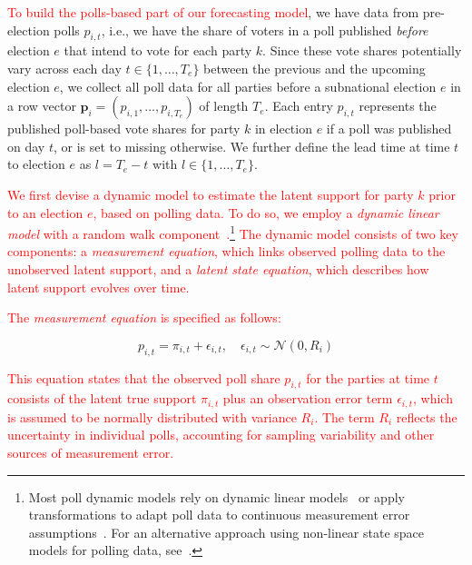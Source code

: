 \documentclass[doublespaced,12pt]{article}
\begin{document}
\begin{doublespacing}
 \textcolor{red}{To build the polls-based part of our forecasting model}, we have data from pre-election polls \( p_{i,t} \), i.e., we have the share of voters in a poll published \textit{before} election $e$ that intend to vote for each party $k$. Since these vote shares potentially vary across each day $t \in \{1, \ldots, T_e\}$ between the previous and the upcoming election $e$, we collect all poll data for all parties  before a subnational election $e$ in a row vector \( \boldsymbol{p}_{i} = (p_{i,1}, \ldots, p_{i,T_{e}}) \) of length $T_e$.   Each entry \( p_{i,t} \) represents the published poll-based vote shares for party $k$ in election $e$ if a poll was published on day \( t \), or  is set to missing otherwise. We further define the lead time at time $t$ to election  $e$ as $l = T_{e} - t$ with $l \in \{1, \ldots, T_e\}$.
 
\textcolor{red}{We first devise a dynamic model to estimate the latent support for party \( k \)  prior to an election \( e \), based on polling data. To do so, we employ a \textit{dynamic linear model} with a random walk component~\citep{west1997}.\footnote{Most poll dynamic models rely on dynamic linear models~\citep{walther2015picking} or apply transformations to adapt poll data to continuous measurement error assumptions~\citep{Stoetzer_Neunhoeffer_Gschwend_Munzert_Sternberg_2019}. For an alternative approach using non-linear state space models for polling data, see~\citep{stoetzer2020estimating}.} The dynamic model consists of two key components: a \textit{measurement equation}, which links observed polling data to the unobserved latent support, and a \textit{latent state equation}, which describes how latent support evolves over time.}

\textcolor{red}{The \textit{measurement equation} is specified as follows:}

\begin{equation}
p_{i,t} = \pi_{i,t} + \epsilon_{i,t}, \quad \epsilon_{i,t} \sim \mathcal{N}(0, R_{i})
\end{equation}

\textcolor{red}{This equation states that the observed poll share \( p_{i,t} \) for the parties at time \( t \) consists of the latent true support \( \pi_{i,t} \) plus an observation error term \( \epsilon_{i,t} \), which is assumed to be normally distributed with variance \( R_i \). The term \( R_i \) reflects the uncertainty in individual polls, accounting for sampling variability and other sources of measurement error.}


\end{doublespacing}
\end{document}

